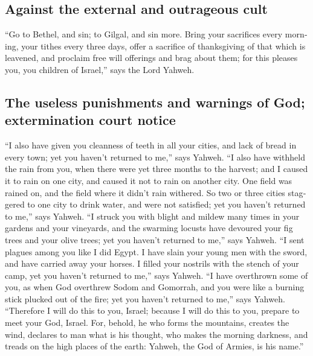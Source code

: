 \begin{paracol}{2}
\begin{otherlanguage}{english}
\hypertarget{against-the-external-and-outrageous-cult}{%
\subsection{Against the external and outrageous
cult}\label{against-the-external-and-outrageous-cult}}

 ``Go to Bethel, and sin; to Gilgal, and sin more. Bring
your sacrifices every morning, your tithes every three days,
 offer a sacrifice of thanksgiving of that which is
leavened, and proclaim free will offerings and brag about them; for this
pleases you, you children of Israel,'' says the Lord Yahweh.

\hypertarget{the-useless-punishments-and-warnings-of-god-extermination-court-notice}{%
\subsection{The useless punishments and warnings of God; extermination
court
notice}\label{the-useless-punishments-and-warnings-of-god-extermination-court-notice}}

 ``I also have given you cleanness of teeth in all your
cities, and lack of bread in every town; yet you haven't returned to
me,'' says Yahweh.  ``I also have withheld the rain from
you, when there were yet three months to the harvest; and I caused it to
rain on one city, and caused it not to rain on another city. One field
was rained on, and the field where it didn't rain withered.
 So two or three cities staggered to one city to drink
water, and were not satisfied; yet you haven't returned to me,'' says
Yahweh.  ``I struck you with blight and mildew many times
in your gardens and your vineyards, and the swarming locusts have
devoured your fig trees and your olive trees; yet you haven't returned
to me,'' says Yahweh.  ``I sent plagues among you like I
did Egypt. I have slain your young men with the sword, and have carried
away your horses. I filled your nostrils with the stench of your camp,
yet you haven't returned to me,'' says Yahweh.  ``I have
overthrown some of you, as when God overthrew Sodom and Gomorrah, and
you were like a burning stick plucked out of the fire; yet you haven't
returned to me,'' says Yahweh.  ``Therefore I will do
this to you, Israel; because I will do this to you, prepare to meet your
God, Israel.  For, behold, he who forms the mountains,
creates the wind, declares to man what is his thought, who makes the
morning darkness, and treads on the high places of the earth: Yahweh,
the God of Armies, is his name.''


\end{otherlanguage}
\end{paracol}
